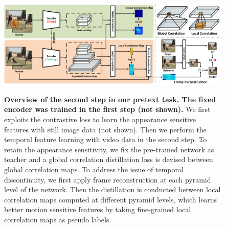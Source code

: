 \documentclass{article}
\begin{document}
\begin{figure}[!tb]
  \centering
  {\includegraphics[width=1.0\textwidth]{figure/framework/framework.pdf}}
  \caption{\small \textbf{Overview of the second step in our pretext task. The fixed encoder was trained in the first step (not shown).} We first exploits the contrastive loss to learn the appearance sensitive features with still image data (not shown). Then we perform the temporal feature learning with video data in the second step. To retain the appearance sensitivity, we fix the pre-trained network as teacher and a global correlation distillation loss is devised between global correlation maps. To address the issue of temporal discontinuity, we first apply frame reconstruction at each pyramid level of the network. Then the distillation is conducted between local correlation maps computed at different pyramid levels, which learns better motion sensitive features by taking fine-grained local correlation maps as pseudo labels. }
  \label{fig:framework}
  \vspace{-5mm}
\end{figure}
\end{document}

